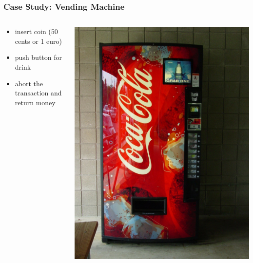 \documentclass{beamer}
\begin{document}
\begin{frame}
  \frametitle{Case Study: Vending Machine}
  \begin{columns}
    \begin{column}{0.6\textwidth}
      \begin{itemize}
      \item insert coin (50 cents or 1 euro)
      \item push button for drink
      \item abort the transaction and return money
      \end{itemize}
    \end{column}
    \begin{column}{0.4\textwidth}
      \begin{center}
        \includegraphics[width=\textwidth]{../pics/vending.jpg}
      \end{center}

    \end{column}
  \end{columns}
\end{frame}
\end{document}
